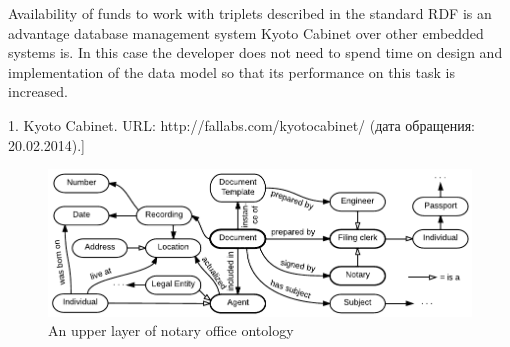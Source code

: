 \documentclass[conference]{IEEEtran}
\begin{document}
Availability of funds to work with triplets described in the standard RDF is an advantage database management system Kyoto Cabinet over other embedded systems is. In this case the developer does not need to spend time on design and implementation of the data model so that its performance on this task is increased.

1.	Kyoto Cabinet. URL: http://fallabs.com/kyotocabinet/ (дата обращения: 20.02.2014).]





%
%
\begin{figure}[!t]
\centering
\includegraphics[width=\linewidth]{DocumentOntology-en.pdf}
\caption{An upper layer of notary office ontology}
\label{notaryontology}
\end{figure}

\end{document}
